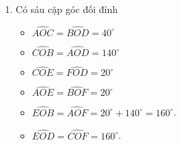\begin{vd}
{\begin{enumerate}
					Suy ra $\widehat{AOE}=\widehat{BOF}=\dfrac{40^{\circ}}{2}=20^{\circ}$.\\
					$\widehat{BOF}=20^{\circ}$ mà $OF$ nằm giữa hai tia $OB$ và $OD$ nên $\widehat{BOF}=20^{\circ}=\dfrac{1}{2}\widehat{BOD}.$\\
					Vậy $OF$ là tia phân giác của góc $BOD$.
					\item Có sáu cặp góc đối đỉnh
					\begin{itemize}
						\item $\widehat{AOC}=\widehat{BOD}=40^{\circ}$ \quad {}
						\item $\widehat{COB}=\widehat{AOD}=140^{\circ}$ \quad {}
						\item $\widehat{COE}=\widehat{FOD}=20^{\circ}$ \quad {}
						\item $\widehat{AOE}=\widehat{BOF}=20^{\circ}$ \quad {}
						\item $\widehat{EOB}=\widehat{AOF}=20^{\circ}+140^{\circ}=160^{\circ}$.
						\item $\widehat{EOD}=\widehat{COF}=160^{\circ}$.
					\end{itemize}
		\end{enumerate}
		}
\end{vd}

